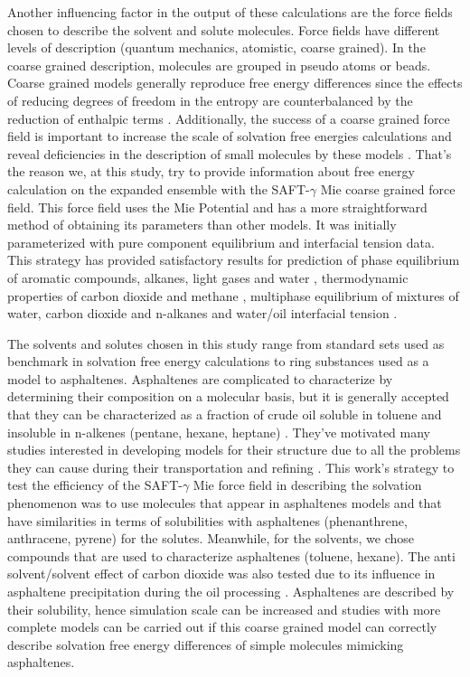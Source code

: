 Another influencing factor in the output of these calculations are the force fields chosen to describe the solvent and solute molecules. Force fields have different levels of description (quantum mechanics, atomistic, coarse grained). In the coarse grained description, molecules are grouped in pseudo atoms or beads. Coarse grained models generally reproduce free energy differences since the effects of reducing degrees of freedom in the entropy are counterbalanced by the reduction of enthalpic terms \cite{kmiecik2016}. Additionally, the success of a coarse grained force field is important to increase the scale of solvation free energies calculations and reveal deficiencies in the description of small molecules by these models \cite{mobley2007,shirts2013}. That's the reason we, at this study, try to provide information about free energy calculation on the expanded ensemble with the SAFT-$\gamma$ Mie coarse grained force field. This force field uses the Mie Potential \cite{MIE} and has a more straightforward method of obtaining its parameters than other models. It was initially parameterized with pure component equilibrium and interfacial tension data. This strategy has provided satisfactory results for prediction of phase equilibrium of aromatic compounds, alkanes, light gases and water \cite{herdes2015,muller2017,lobanova2015} , thermodynamic properties of carbon dioxide and methane \cite{cassiano1}, multiphase equilibrium of mixtures of water, carbon dioxide and n-alkanes \cite{lobanova2016} and water/oil interfacial tension \cite{herdes2017}. 

The solvents and solutes chosen in this study range from standard sets used as benchmark in solvation free energy calculations to ring substances used as a model to asphaltenes. Asphaltenes are complicated to characterize by determining their composition on a molecular basis, but it is generally accepted that they can be characterized as a fraction of crude oil soluble in toluene and insoluble in n-alkenes (pentane, hexane, heptane) \cite{SJOBLOM2003399}. They've motivated many studies interested in developing models for their structure due to all the problems they can cause during their transportation and refining \cite{SJOBLOM20151}. This work’s strategy to test the efficiency of the SAFT-$\gamma$ Mie force field in describing the solvation phenomenon was to use molecules that appear in asphaltenes models and that have similarities in terms of solubilities with asphaltenes (phenanthrene, anthracene, pyrene) for the solutes. Meanwhile, for the solvents, we chose compounds that are used to characterize asphaltenes (toluene, hexane). The anti solvent/solvent effect of carbon dioxide was also tested due to its influence in asphaltene precipitation during the oil processing \cite{SOROUSH2014405}. Asphaltenes are described by their solubility, hence simulation scale can be increased and studies with more complete models can be carried out if this coarse grained model can correctly describe solvation free energy differences of simple molecules mimicking asphaltenes.

